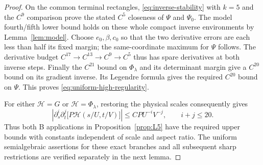\documentclass[11pt,a4paper]{article}
\numberwithin{equation}{section}
\theoremstyle{remark}
\begin{document}
\begin{proof}
On the common terminal rectangles, \eqref{eq:inverse-stability} with
$k=5$ and the $C^9$ comparison prove the stated $C^5$ closeness of
$\Psi$ and $\Psi_0$. The model fourth/fifth lower bound holds on these
whole compact inverse environments by Lemma~\ref{lem:model}. Choose
$e_0,\beta,c_0$ so that the two derivative errors are each less than
half its fixed margin; the same-coordinate maximum for $\Psi$ follows.
The derivative budget $C^{17}\to C^{13}\to C^9\to C^5$ thus has spare
derivatives at both inverse steps. Finally the $C^{21}$ bound on
$\Phi_\lambda$ and its determinant margin give a $C^{20}$ bound on
its gradient inverse. Its Legendre formula gives the required $C^{20}$
bound on $\Psi$. This proves \eqref{eq:uniform-high-regularity}.

For either $\mathcal H=G$ or $\mathcal H=\Phi_\lambda$, restoring the
physical scales consequently gives
\begin{equation}\label{eq:physical-derivative-bounds}
 \left|\partial_s^i\partial_t^j
       \bigl[P\mathcal H(s/U,t/V)\bigr]\right|
 \le C P U^{-i}V^{-j},\qquad i+j\le20.
\end{equation}
Thus both B applications in Proposition~\ref{prop:L5} have the required
upper bounds with constants independent of scale and aspect ratio.
The uniform semialgebraic assertions for these exact branches and all
subsequent sharp restrictions are verified separately in the next lemma.
\end{proof}
\end{document}
